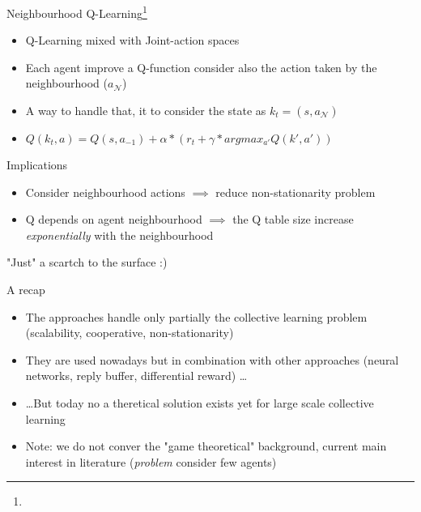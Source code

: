 \documentclass[presentation]{beamer}\mode<presentation>{\usetheme{AMSBolognaFC}}
\begin{document}
\begin{frame}{Neighbourhood Q-Learning\footnote{}}
	\begin{exampleblock}{}
		\begin{itemize}
			\item Q-Learning mixed with Joint-action spaces
			\item Each agent improve a Q-function consider also the action taken by the neighbourhood ($a_{\mathcal{N}}$)
			\item A way to handle that, it to consider the state as $k_t = (s, a_{\mathcal{N}})$
			\item $Q(k_t, a) = Q(s, a_{-1}) + \alpha * (r_t + \gamma * argmax_{a'}Q(k', a'))$
		\end{itemize}
	\end{exampleblock}

	\begin{exampleblock}{Implications}
		\begin{itemize}
			\item[{\color{teal}\faThumbsUp}] Consider neighbourhood actions $\implies$  reduce non-stationarity problem 
			\item[{\color{red}\faThumbsDown}] Q depends on agent neighbourhood $\implies$ the Q table size increase \emph{exponentially} with the neighbourhood
		\end{itemize}
	\end{exampleblock}
\end{frame}
\begin{frame}{"Just" a scartch to the surface :)}
	\begin{exampleblock}{A recap}
		\begin{itemize}
			\item The approaches handle only partially the collective learning problem (scalability, cooperative, non-stationarity)
			\item They are used nowadays but in combination with other approaches (neural networks, reply buffer, differential reward) \dots
			\item \dots But today no a theretical solution exists yet for large scale collective learning
			\item Note: we do not conver the "game theoretical" background, current main interest in literature (\emph{problem} consider few agents)
		\end{itemize}
	\end{exampleblock}
\end{frame}
\end{document}
